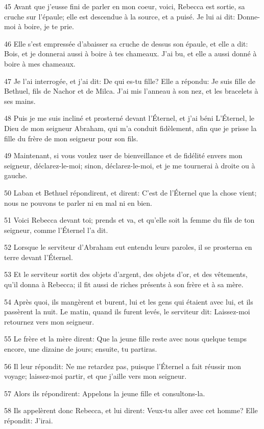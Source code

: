 \par 45 Avant que j'eusse fini de parler en mon coeur, voici, Rebecca est sortie, sa cruche sur l'épaule; elle est descendue à la source, et a puisé. Je lui ai dit: Donne-moi à boire, je te prie.
\par 46 Elle s'est empressée d'abaisser sa cruche de dessus son épaule, et elle a dit: Bois, et je donnerai aussi à boire à tes chameaux. J'ai bu, et elle a aussi donné à boire à mes chameaux.
\par 47 Je l'ai interrogée, et j'ai dit: De qui es-tu fille? Elle a répondu: Je suis fille de Bethuel, fils de Nachor et de Milca. J'ai mis l'anneau à son nez, et les bracelets à ses mains.
\par 48 Puis je me suis incliné et prosterné devant l'Éternel, et j'ai béni L'Éternel, le Dieu de mon seigneur Abraham, qui m'a conduit fidèlement, afin que je prisse la fille du frère de mon seigneur pour son fils.
\par 49 Maintenant, si vous voulez user de bienveillance et de fidélité envers mon seigneur, déclarez-le-moi; sinon, déclarez-le-moi, et je me tournerai à droite ou à gauche.
\par 50 Laban et Bethuel répondirent, et dirent: C'est de l'Éternel que la chose vient; nous ne pouvons te parler ni en mal ni en bien.
\par 51 Voici Rebecca devant toi; prends et va, et qu'elle soit la femme du fils de ton seigneur, comme l'Éternel l'a dit.
\par 52 Lorsque le serviteur d'Abraham eut entendu leurs paroles, il se prosterna en terre devant l'Éternel.
\par 53 Et le serviteur sortit des objets d'argent, des objets d'or, et des vêtements, qu'il donna à Rebecca; il fit aussi de riches présents à son frère et à sa mère.
\par 54 Après quoi, ils mangèrent et burent, lui et les gens qui étaient avec lui, et ils passèrent la nuit. Le matin, quand ils furent levés, le serviteur dit: Laissez-moi retournez vers mon seigneur.
\par 55 Le frère et la mère dirent: Que la jeune fille reste avec nous quelque temps encore, une dizaine de jours; ensuite, tu partiras.
\par 56 Il leur répondit: Ne me retardez pas, puisque l'Éternel a fait réussir mon voyage; laissez-moi partir, et que j'aille vers mon seigneur.
\par 57 Alors ils répondirent: Appelons la jeune fille et consultons-la.
\par 58 Ils appelèrent donc Rebecca, et lui dirent: Veux-tu aller avec cet homme? Elle répondit: J'irai.
